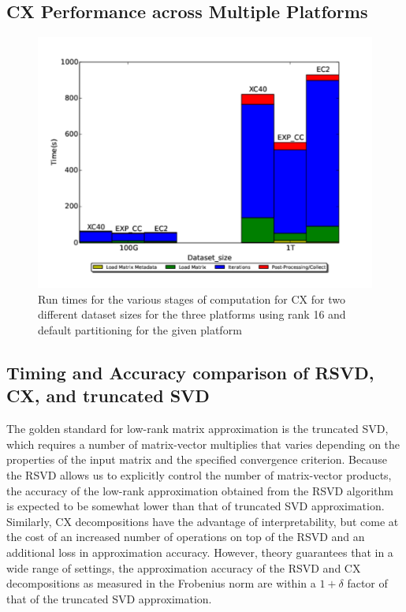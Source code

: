   \subsection{CX Performance across Multiple Platforms}
  \label{sect:h2h}
    
    \begin{figure} [H]
    \begin{centering}
    \includegraphics[scale=0.4]{images/CX_Size_Scaling_Rank_16_Partitions_default.pdf}
    \end{centering}
    \caption{ Run times for the various stages of computation for CX for two different dataset sizes for the three platforms using rank 16 and default partitioning for the given platform} 
    \label{fig:h2hrank16} 
    \end{figure}

    
  

  
  \subsection{Timing and Accuracy comparison of RSVD, CX, and truncated SVD}

  The golden standard for low-rank matrix approximation is the truncated SVD, which requires a number of matrix-vector multiplies 
  that varies depending on the properties of the input matrix and the specified convergence criterion. Because the RSVD allows us to
  explicitly control the number of matrix-vector products, the accuracy of the low-rank approximation obtained from the RSVD algorithm
  is expected to be somewhat lower than that of truncated SVD approximation. Similarly, CX decompositions have the advantage of interpretability,
  but come at the cost of an increased number of operations on top of the RSVD and an additional loss in approximation accuracy. However, theory
  guarantees that in a wide range of settings, the approximation accuracy of the RSVD and CX decompositions as measured in the Frobenius norm
  are within a $1 + \delta$ factor of that of the truncated SVD approximation. 

